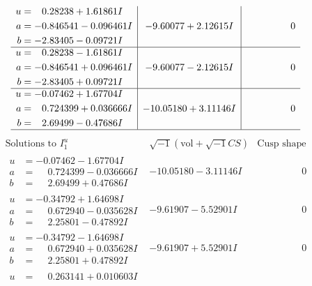 \documentclass[1p]{elsarticle_modified}
\theoremstyle{definition}
\newcommand{\I}{\sqrt{-1}}
\begin{document}
$$\begin{array}{c|c|c}
\begin{aligned}
u &= \phantom{-}0.28238 + 1.61861 I \\
a &= -0.846541 - 0.096461 I \\
b &= -2.83405 - 0.09721 I\end{aligned}
 & -9.60077 + 2.12615 I & \phantom{-0.000000 } 0 \\ \hline\begin{aligned}
u &= \phantom{-}0.28238 - 1.61861 I \\
a &= -0.846541 + 0.096461 I \\
b &= -2.83405 + 0.09721 I\end{aligned}
 & -9.60077 - 2.12615 I & \phantom{-0.000000 } 0 \\ \hline\begin{aligned}
u &= -0.07462 + 1.67704 I \\
a &= \phantom{-}0.724399 + 0.036666 I \\
b &= \phantom{-}2.69499 - 0.47686 I\end{aligned}
 & -10.05180 + 3.11146 I & \phantom{-0.000000 } 0\\
 \hline 
 \end{array}$$\newpage$$\begin{array}{c|c|c}  
\text{Solutions to }I^u_{1}& \I (\text{vol} + \sqrt{-1}CS) & \text{Cusp shape}\\
 \hline 
\begin{aligned}
u &= -0.07462 - 1.67704 I \\
a &= \phantom{-}0.724399 - 0.036666 I \\
b &= \phantom{-}2.69499 + 0.47686 I\end{aligned}
 & -10.05180 - 3.11146 I & \phantom{-0.000000 } 0 \\ \hline\begin{aligned}
u &= -0.34792 + 1.64698 I \\
a &= \phantom{-}0.672940 - 0.035628 I \\
b &= \phantom{-}2.25801 - 0.47892 I\end{aligned}
 & -9.61907 - 5.52901 I & \phantom{-0.000000 } 0 \\ \hline\begin{aligned}
u &= -0.34792 - 1.64698 I \\
a &= \phantom{-}0.672940 + 0.035628 I \\
b &= \phantom{-}2.25801 + 0.47892 I\end{aligned}
 & -9.61907 + 5.52901 I & \phantom{-0.000000 } 0 \\ \hline\begin{aligned}
u &= \phantom{-}0.263141 + 0.010603 I \\

\end{aligned}
\end{array}$$
\end{document}
